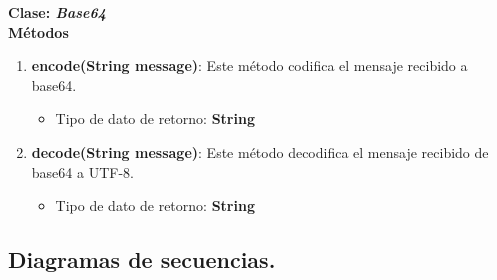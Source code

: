 \documentclass[12pt, a4paper, titlepage]{report}
\begin{document}
    		        
    		        
    		    \textbf{\textcolor{guindapoli}{Clase: \textit{Base64}}}\\
                    
		            \textbf{Métodos}
    		        \begin{enumerate}
    		            \item \textbf{encode(String message)}: Este método codifica el mensaje recibido a base64.
    		            \begin{itemize}
    		                \item Tipo de dato de retorno: \textbf{String}
    		            \end{itemize}
    		            \item \textbf{decode(String message)}: Este método decodifica el mensaje recibido de base64 a UTF-8.
    		            \begin{itemize}
    		                \item Tipo de dato de retorno: \textbf{String}
    		            \end{itemize}
    		        \end{enumerate}
                    
            \subsection{Diagramas de secuencias.}
        
\end{document}
